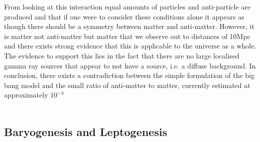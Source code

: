 From looking at this interaction equal amounts of particles and anti-particle are produced and that if one were to consider these conditions alone it appears as though there should be a symmetry between matter and anti-matter. However, it is matter not anti-matter but matter that we observe out to distances of 10Mpc \cite{1} and there exists strong evidence that this is applicable to the universe as a whole. The evidence to support this lies in the fact that there are no large localised gamma ray sources that appear to not have a source, i.e. a diffuse background. In conclusion, there exists a contradiction between the simple formulation of the big bang model and the small ratio of anti-matter to matter, currently estimated at approximately $10^{-4}$ \cite{13}\cite{5}
~\\

\ %
\subsection{Baryogenesis and Leptogenesis}

